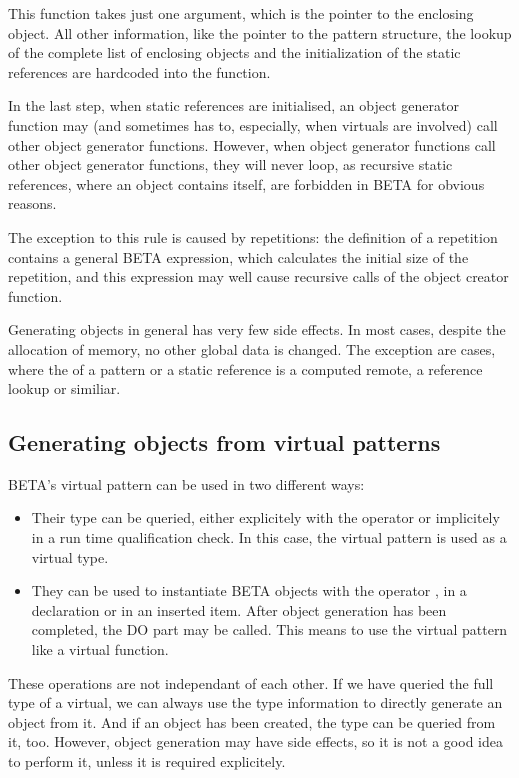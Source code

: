 This function takes just one argument, which is the pointer to
the enclosing object.  All other information, like the pointer to
the pattern structure, the lookup of the complete list of
enclosing objects and the initialization of the static references
are hardcoded into the function.

In the last step, when static references are initialised, an
object generator function may (and sometimes has to, especially,
when virtuals are involved) call other object generator
functions.  However, when  object generator functions call other
object generator functions, they will never loop, as recursive
static references, where an object contains itself, are forbidden
in BETA for obvious reasons.

The exception to this rule is caused by repetitions: the
definition of a repetition contains a general BETA expression,
which calculates the initial size of the repetition, and this
expression may well cause recursive calls of the object creator
function.

Generating objects in general has very few side effects.  In most
cases, despite the allocation of memory, no other global data is
changed.  The exception are cases, where the  of a
pattern or a static reference is a computed remote, a reference
lookup or similiar.

\subsection{Generating objects from virtual patterns}
BETA's virtual pattern can be used in two different ways:
\begin{itemize}
\item Their type can be queried, either explicitely with the
    operator \cq{\#\#} or implicitely in a run time qualification
    check.  In this case, the virtual pattern is used as a virtual
    type.
\item They can be used to instantiate BETA objects with the
    operator \cq{\&}, in a declaration or in an inserted item.
    After object generation has been completed, the DO part may
    be called.  This means to use the virtual pattern like a
    virtual function.
\end{itemize}
These operations are not independant of each other.  If we have
queried the full type of a virtual, we can always use the type
information to directly generate an object from it.  And if an
object has been created, the type can be queried from it, too.
However, object generation may have side effects, so it is not a
good idea to perform it, unless it is required explicitely.

